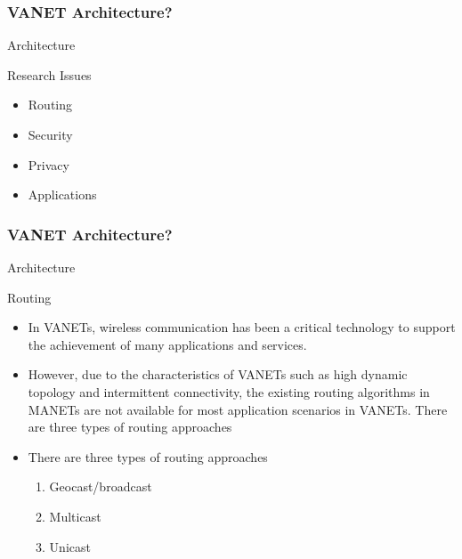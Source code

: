 \documentclass{beamer}
\begin{document}

\begin{frame}
	
	\frametitle{VANET Architecture?}
	\begin{block}{Architecture}
		\begin{block}{Research Issues }
		\begin{itemize}
		\item Routing
		\item Security
	    \item Privacy
		\item Applications
		
		\end{itemize}
			
		\end{block}
	\end{block}
	
\end{frame}


\begin{frame}
	
	\frametitle{VANET Architecture?}
	\begin{block}{Architecture}
		\begin{block}{Routing }
			\begin{itemize}
				\item In VANETs, wireless communication has been a critical technology to support the achievement of many applications and services.
				\item However, due to the characteristics of  VANETs such as high dynamic topology and intermittent connectivity, the existing routing algorithms in MANETs are not available for most application scenarios in VANETs.
				There are three types of routing approaches
				\item There are three types of routing approaches
				\begin{enumerate}
				
				\item Geocast/broadcast
				\item Multicast
				\item Unicast
		     	\end{enumerate}
				
			\end{itemize}
			
		\end{block}
	
\end{block}	
	
\end{frame}
\end{document}
